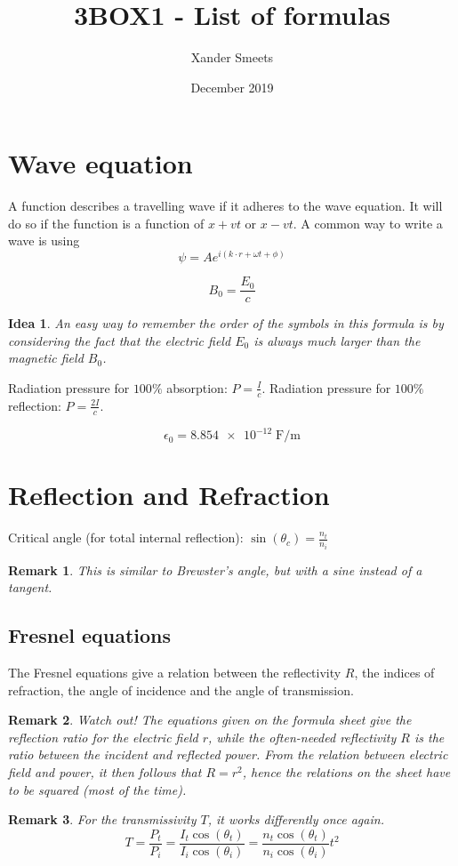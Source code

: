 \documentclass{article}
\title{3BOX1 - List of formulas}
\author{Xander Smeets}
\date{December 2019}
\newtheorem*{remark}{Remark}
\newtheorem*{idea}{Idea}
\begin{document}
\maketitle

\section{Wave equation}
A function describes a travelling wave if it adheres to the wave equation.
It will do so if the function is a function of $x+vt$ or $x-vt$.
A common way to write a wave is using $$\psi{}=A e^{i\left(k\cdot r + \omega t + \phi\right)}$$

$$B_0=\frac{E_0}{c}$$
\begin{idea}
An easy way to remember the order of the symbols in this formula is by considering the fact that the electric field $E_0$ is always much larger than the magnetic field $B_0$.
\end{idea}

\noindent{}Radiation pressure for $100\%$ absorption: $P=\frac{I}{c}$.\newline
Radiation pressure for $100\%$ reflection: $P=\frac{2I}{c}$.

$$\epsilon_0=\num{8.854e-12}\;  \si{\farad\per\metre}$$

\section{Reflection and Refraction}

Critical angle (for total internal reflection): $\sin(\theta{}_c)=\frac{n_t}{n_i}$\newline
\begin{remark}
This is similar to Brewster's angle, but with a sine instead of a tangent.
\end{remark}

\subsection{Fresnel equations}
The Fresnel equations give a relation between the reflectivity $R$, the indices of refraction, the angle of incidence and the angle of transmission.
\begin{remark}
Watch out!
The equations given on the formula sheet give the reflection ratio for the \emph{electric field} $r$, while the often-needed reflectivity $R$ is the ratio between the incident and reflected \emph{power}.
From the relation between electric field and power, it then follows that $R=r^2$, hence the relations on the sheet have to be squared (most of the time).
\end{remark}
\begin{remark}
For the transmissivity $T$, it works differently once again.
$$T=\frac{P_t}{P_i}=\frac{I_t\cos(\theta_t)}{I_i\cos(\theta_i)}=\frac{n_t\cos(\theta_t)}{n_i\cos(\theta_i)}t^2$$
\end{remark}
\end{document}
